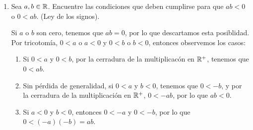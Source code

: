\begin{enumerate}[label=\alph*)]


 \item Sea $a,b\in \mathbb{R}$. Encuentre las condiciones que deben cumplirse para que $ab<0$ o $0<ab$. (Ley de los signos).
 
 Si $a$ o $b$ son cero, tenemos que $ab=0$, por lo que descartamos esta posiblidad. Por tricotomía, $0<a$ o $a<0$ y $0<b$ o $b<0$, entonces observemos los casos:
 \begin{enumerate}[label=\roman*)]
  \item Si $0<a$ y $0<b$, por la cerradura de la multiplicacón en $\mathbb{R}^+$, tenemos que $0<ab$.
  \item Sin pérdida de generalidad, si $0<a$ y $b<0$, tenemos que $0<-b$, y por la cerradura de la multiplicación en $\mathbb{R}^+$, $0<-ab$, por lo que $ab<0$.
  \item Si $a<0$ y $b<0$, entonces $0<-a$ y $0<-b$, por lo que $0<(-a)(-b)=ab$.
 \end{enumerate}


\end{enumerate}
